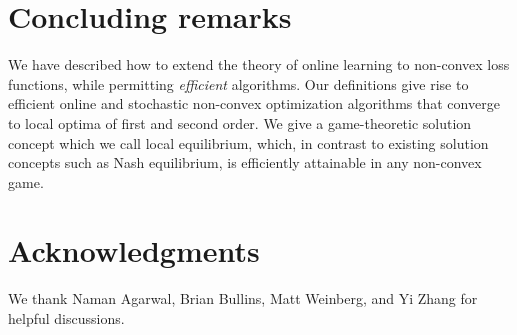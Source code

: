 \documentclass{article}
\begin{document}
 
\section{Concluding remarks}
We have described how to extend the theory of online learning to non-convex loss functions, while permitting \emph{efficient} algorithms. Our definitions give rise to efficient online and stochastic non-convex optimization algorithms that converge to local optima of first and second order. We give a game-theoretic solution concept which we call local equilibrium, which, in contrast to existing solution concepts such as Nash equilibrium, is efficiently attainable in any non-convex game.

\section*{Acknowledgments}
We thank Naman Agarwal, Brian Bullins, Matt Weinberg, and Yi Zhang for helpful discussions.



\end{document}
